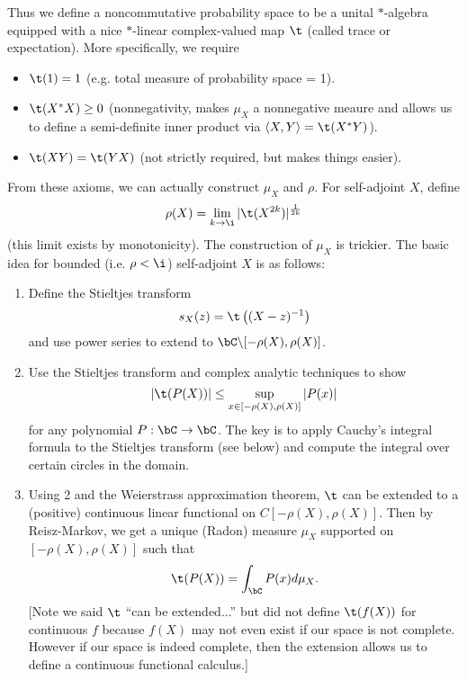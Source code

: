 \clearpage
\newpage

Thus we define a noncommutative probability space to be a unital $*$-algebra equipped with a nice $*$-linear complex-valued map $\t$ (called trace or expectation). More specifically, we require
\begin{itemize}
    \item $\t(1) = 1$ (e.g. total measure of probability space = 1).
    \item $\t(X^*X) \ge 0$ (nonnegativity, makes $\mu_X$ a nonnegative meaure and allows us to define a semi-definite inner product via $\langle X, Y \rangle = \t(X^*Y)$).
    \item $\t(XY) = \t(YX)$ (not strictly required, but makes things easier).
\end{itemize}

From these axioms, we can actually construct $\mu_X$ and $\rho$. For self-adjoint $X$, define
\[
    \rho(X) = \lim_{k \to \i}|\t(X^{2k})|^{\frac{1}{2k}}
\]
(this limit exists by monotonicity). The construction of $\mu_X$ is trickier. The basic idea for bounded (i.e. $\rho < \i$) self-adjoint $X$ is as follows:
\begin{enumerate}
    \item Define the Stieltjes transform
    \[
        s_X(z) = \t\left( (X - z)^{-1} \right)
    \]
    and use power series to extend to $\bC\backslash [-\rho(X), \rho(X)]$.
    \item Use the Stieltjes transform and complex analytic techniques to show
    \[
        |\t(P(X))| \le \sup_{x \in [-\rho(X), \rho(X)]} |P(x)|
    \]
    for any polynomial $P: \bC \to \bC$. The key is to apply Cauchy's integral formula to the Stieltjes transform (see below) and compute the integral over certain circles in the domain.
    \item Using 2 and the Weierstrass approximation theorem, $\t$ can be extended to a (positive) continuous linear functional on $C[-\rho(X), \rho(X)]$. Then by Reisz-Markov, we get a unique (Radon) measure $\mu_X$ supported on $[-\rho(X), \rho(X)]$ such that
    \[
        \t(P(X)) = \int_\bC P(x) d\mu_X.
    \]
    [Note we said $\t$ ``can be extended...'' but did not define $\t(f(X))$ for continuous $f$ because $f(X)$ may not even exist if our space is not complete. However if our space is indeed complete, then the extension allows us to define a continuous functional calculus.]
\end{enumerate}

